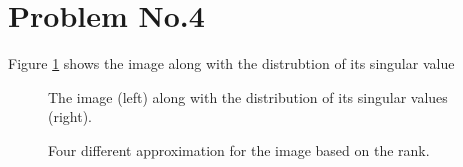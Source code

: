 \section*{Problem No.4} \label{sec:prob4}
Figure \ref{fig:fig4_ab} shows the image along with the distrubtion of its singular value 
\begin{figure}[tbh]
\centering        
   \caption{ The image (left) along with the distribution of its singular values (right).}
   \label{fig:fig4_ab}
\end{figure}

\begin{figure}[tbh]
\centering        
   \caption{Four different approximation for the image based on the rank. }
   \label{fig:fig4_c}
\end{figure}

